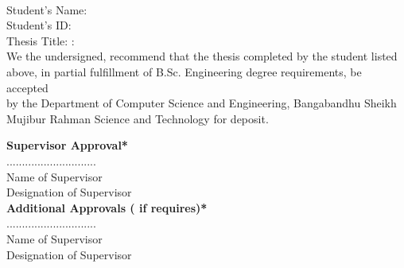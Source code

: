 \begin{titlepage}
\begin{center}
%
%
\\
%
%
%
 Student's Name:\\ 
 Student's ID:\\ 
 Thesis Title: :\\ 


%
\vspace*{.5cm}
We the undersigned, recommend that the thesis completed by the student listed\\ [-5pt]
 above, in partial fulfillment of B.Sc. Engineering degree requirements, be accepted \\[-5pt] 
by the Department of Computer Science and Engineering, Bangabandhu Sheikh \\[-5pt]
 Mujibur Rahman Science and Technology for deposit. 

\vspace*{1.0cm}
\noindent \large \textbf{Supervisor Approval*} \\[15pt]
............................. \\ [-5pt]
Name of Supervisor \\ [-5pt]
Designation of Supervisor \\ [-5pt]


\vspace*{1.0cm}
\noindent \large \textbf{Additional Approvals ( if requires)*} \\[15pt]
  ............................. \\ [-5pt]
  Name of Supervisor \\[-5pt]
  Designation of Supervisor \\[-5pt]


\end{center}
\end{titlepage}
